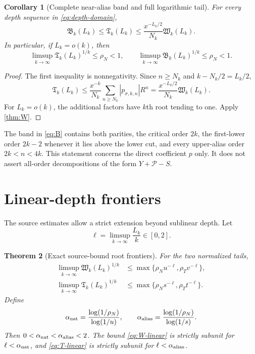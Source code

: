 \documentclass[11pt]{article}
\newtheorem{theorem}{Theorem}[section]
\newtheorem{corollary}[theorem]{Corollary}
\theoremstyle{remark}
\begin{document}
\begin{corollary}[Complete near-alias band and full logarithmic tail]
\label{cor:band}
For every depth sequence in \eqref{eq:depth-domain},
\begin{equation}\label{eq:T-from-W}
 \mathfrak B_k(L_k)\le\mathfrak T_k(L_k)
 \le\frac{x^{-L_k/2}}{N_k}\mathfrak W_k(L_k).
\end{equation}
In particular, if $L_k=o(k)$, then
\begin{equation}\label{eq:B-root}
 \boxed{
 \limsup_{k\to\infty}\mathfrak T_k(L_k)^{1/k}
 \le\rho_N<1,\qquad
 \limsup_{k\to\infty}\mathfrak B_k(L_k)^{1/k}
 \le\rho_N<1.}
\end{equation}
\end{corollary}

\begin{proof}
The first inequality is nonnegativity.  Since $n\ge N_k$ and
$k-N_k/2=L_k/2$,
\[
 \mathfrak T_k(L_k)
 \le\frac{x^{-k}}{N_k}\sum_{n\ge N_k}|p_{\sigma,k,n}|R^n
 =\frac{x^{-L_k/2}}{N_k}\mathfrak W_k(L_k).
\]
For $L_k=o(k)$, the additional factors have $k$th root tending to one.
Apply \cref{thm:W}.
\end{proof}

The band in \eqref{eq:B} contains both parities, the critical order $2k$,
the first-lower order $2k-2$ whenever it lies above the lower cut, and every
upper-alias order $2k<n<4k$.  This statement concerns the direct coefficient
$p$ only.  It does not assert all-order decompositions of the form
$Y+\mathcal P-S$.

\section{Linear-depth frontiers}

The source estimates allow a strict extension beyond sublinear depth.  Let
\begin{equation}\label{eq:ell}
 \ell=\limsup_{k\to\infty}\frac{L_k}{k}\in[0,2].
\end{equation}

\begin{theorem}[Exact source-bound root frontiers]\label{thm:frontiers}
For the two normalized tails,
\begin{align}
 \limsup_{k\to\infty}\mathfrak W_k(L_k)^{1/k}
 &\le\max\{\rho_Nu^{-\ell},\rho_Tv^{-\ell}\},
 \label{eq:W-linear}\\
 \limsup_{k\to\infty}\mathfrak T_k(L_k)^{1/k}
 &\le\max\{\rho_Ns^{-\ell},\rho_Tt^{-\ell}\}.
 \label{eq:T-linear}
\end{align}
Define
\begin{equation}\label{eq:alphas}
 \alpha_{\rm nat}
 =\frac{\log(1/\rho_N)}{\log(1/u)},
 \qquad
 \alpha_{\rm alias}
 =\frac{\log(1/\rho_N)}{\log(1/s)}.
\end{equation}
Then $0<\alpha_{\rm nat}<\alpha_{\rm alias}<2$.
The bound \eqref{eq:W-linear} is strictly subunit for
$\ell<\alpha_{\rm nat}$, and \eqref{eq:T-linear} is strictly subunit for
$\ell<\alpha_{\rm alias}$.
\end{theorem}
\end{document}
